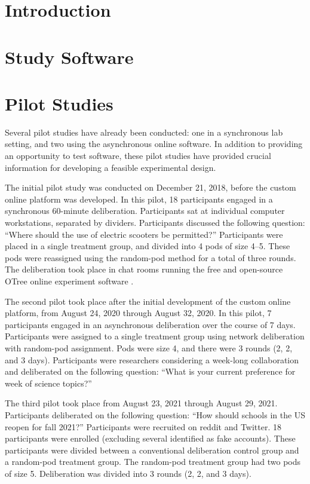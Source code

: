 \section{Introduction}


\section{Study Software}


\section{Pilot Studies}
Several pilot studies have already been conducted:
one in a synchronous lab setting, and two using the asynchronous online
software.
In addition to providing an opportunity to test software,
these pilot studies have provided crucial information for developing a
feasible experimental design.

The initial pilot study was conducted on December 21, 2018,
before the custom online platform was developed.
In this pilot, 18 participants engaged in a synchronous 60-minute deliberation.
Participants sat at individual computer workstations, separated by dividers.
Participants discussed the following question:
``Where should the use of electric scooters be permitted?''
Participants were placed in a single treatment group, and divided into 4
pods of size 4--5.
These pods were reassigned using the random-pod method for a total of three
rounds.
The deliberation took place in chat rooms running the free and open-source
OTree online experiment software \cite{chen_oTree_2016}.

The second pilot took place after the initial development of the custom online
platform, from August 24, 2020 through August 32, 2020.
In this pilot, 7 participants engaged in an asynchronous deliberation over the
course of 7 days.
Participants were assigned to a single treatment group using network deliberation
with random-pod assignment.
Pods were size 4, and there were 3 rounds (2, 2, and 3 days).
Participants were researchers considering a week-long collaboration and
deliberated on the following question:
``What is your current preference for week of science topics?''

The third pilot took place from August 23, 2021 through August 29, 2021.
Participants deliberated on the following question:
``How should schools in the US reopen for fall 2021?''
Participants were recruited on reddit and Twitter.
18 participants were enrolled (excluding several identified as fake accounts).
These participants were divided between a conventional deliberation control
group and a random-pod treatment group.
The random-pod treatment group had two pods of size 5.
Deliberation was divided into 3 rounds (2, 2, and 3 days).

